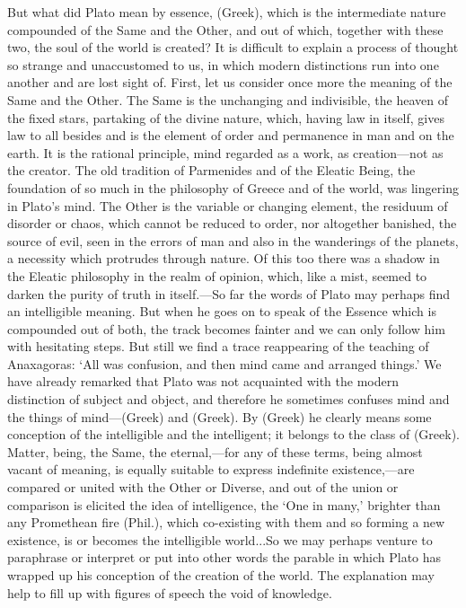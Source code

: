But what did Plato mean by essence, (Greek), which is the intermediate
nature compounded of the Same and the Other, and out of which, together
with these two, the soul of the world is created? It is difficult to
explain a process of thought so strange and unaccustomed to us, in which
modern distinctions run into one another and are lost sight of. First, let
us consider once more the meaning of the Same and the Other. The Same is
the unchanging and indivisible, the heaven of the fixed stars, partaking
of the divine nature, which, having law in itself, gives law to all
besides and is the element of order and permanence in man and on the
earth. It is the rational principle, mind regarded as a work, as creation—not
as the creator. The old tradition of Parmenides and of the Eleatic Being,
the foundation of so much in the philosophy of Greece and of the world,
was lingering in Plato’s mind. The Other is the variable or changing
element, the residuum of disorder or chaos, which cannot be reduced to
order, nor altogether banished, the source of evil, seen in the errors of
man and also in the wanderings of the planets, a necessity which protrudes
through nature. Of this too there was a shadow in the Eleatic philosophy
in the realm of opinion, which, like a mist, seemed to darken the purity
of truth in itself.—So far the words of Plato may perhaps find an
intelligible meaning. But when he goes on to speak of the Essence which is
compounded out of both, the track becomes fainter and we can only follow
him with hesitating steps. But still we find a trace reappearing of the
teaching of Anaxagoras: ‘All was confusion, and then mind came and
arranged things.’ We have already remarked that Plato was not acquainted
with the modern distinction of subject and object, and therefore he
sometimes confuses mind and the things of mind—(Greek) and (Greek).
By (Greek) he clearly means some conception of the intelligible and the
intelligent; it belongs to the class of (Greek). Matter, being, the Same,
the eternal,—for any of these terms, being almost vacant of meaning,
is equally suitable to express indefinite existence,—are compared or
united with the Other or Diverse, and out of the union or comparison is
elicited the idea of intelligence, the ‘One in many,’ brighter than any
Promethean fire (Phil.), which co-existing with them and so forming a new
existence, is or becomes the intelligible world...So we may perhaps
venture to paraphrase or interpret or put into other words the parable in
which Plato has wrapped up his conception of the creation of the world.
The explanation may help to fill up with figures of speech the void of
knowledge.


